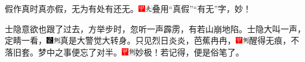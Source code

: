 假作真时真亦假，无为有处有还无。{\includegraphics[width=3mm]{../Images/00002}\includegraphics[width=3mm]{../Images/00012}\footnotesize \kaishu 叠用``真假''``有无''字，妙！}

士隐意欲也跟了过去，方举步时，忽听一声霹雳，有若山崩地陷。士隐大叫一声，定睛一看，{\includegraphics[width=3mm]{../Images/00006}\includegraphics[width=3mm]{../Images/00011}\footnotesize \kaishu 真是大警觉大转身。}只见烈日炎炎，芭蕉冉冉，{\includegraphics[width=3mm]{../Images/00002}\includegraphics[width=3mm]{../Images/00011}\footnotesize \kaishu 醒得无痕，不落旧套。}梦中之事便忘了对半。{\includegraphics[width=3mm]{../Images/00002}\includegraphics[width=3mm]{../Images/00011}\footnotesize \kaishu 妙极！若记得，便是俗笔了。}

